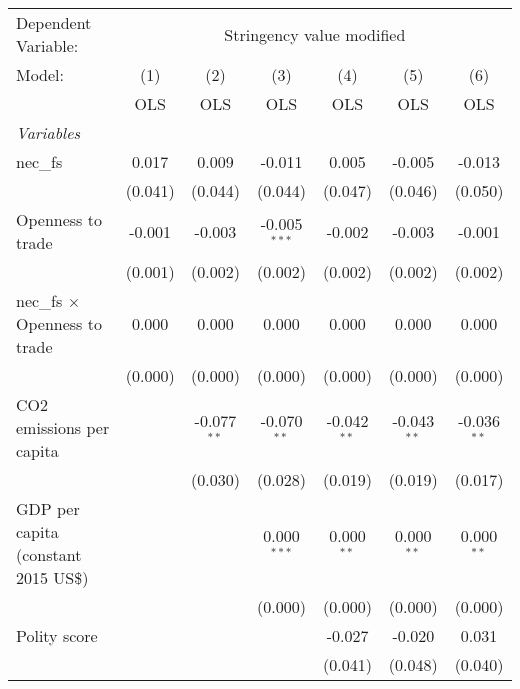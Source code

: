 
\begingroup
\centering
\begin{tabular}{lcccccc}
   \toprule
   Dependent Variable: & \multicolumn{6}{c}{Stringency value modified}\\
   Model:                               & (1)     & (2)           & (3)            & (4)           & (5)           & (6)\\  
                                        &  OLS    & OLS           & OLS            & OLS           & OLS           & OLS\\  
   \midrule
   \emph{Variables}\\
   nec\_fs                              & 0.017   & 0.009         & -0.011         & 0.005         & -0.005        & -0.013\\   
                                        & (0.041) & (0.044)       & (0.044)        & (0.047)       & (0.046)       & (0.050)\\   
   Openness to trade                    & -0.001  & -0.003        & -0.005$^{***}$ & -0.002        & -0.003        & -0.001\\   
                                        & (0.001) & (0.002)       & (0.002)        & (0.002)       & (0.002)       & (0.002)\\   
   nec\_fs $\times$ Openness to trade   & 0.000   & 0.000         & 0.000          & 0.000         & 0.000         & 0.000\\   
                                        & (0.000) & (0.000)       & (0.000)        & (0.000)       & (0.000)       & (0.000)\\   
   CO2 emissions per capita             &         & -0.077$^{**}$ & -0.070$^{**}$  & -0.042$^{**}$ & -0.043$^{**}$ & -0.036$^{**}$\\   
                                        &         & (0.030)       & (0.028)        & (0.019)       & (0.019)       & (0.017)\\   
   GDP per capita (constant 2015 US\$)  &         &               & 0.000$^{***}$  & 0.000$^{**}$  & 0.000$^{**}$  & 0.000$^{**}$\\   
                                        &         &               & (0.000)        & (0.000)       & (0.000)       & (0.000)\\   
   Polity score                         &         &               &                & -0.027        & -0.020        & 0.031\\   
                                        &         &               &                & (0.041)       & (0.048)       & (0.040)\\   

\end{tabular}
